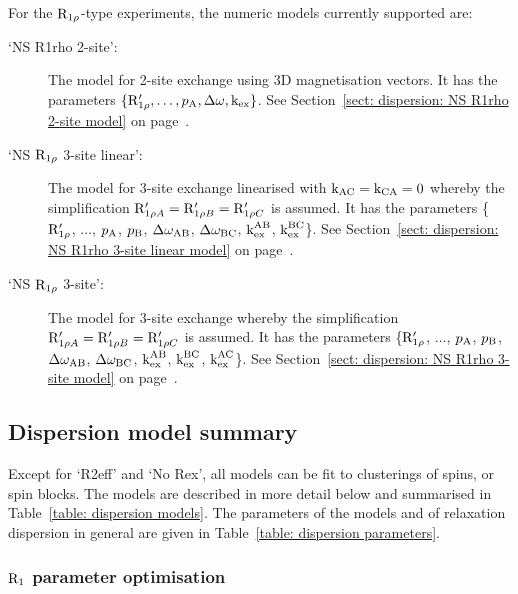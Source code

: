 For the $\mathrm{R}_{1\rho}$-type experiments, the numeric models currently supported are:
\begin{description}
  \item[`NS R1rho 2-site':]  The model for 2-site exchange using 3D magnetisation vectors.
    It has the parameters $\{\mathrm{R}_{1\rho}', \dots, p_{\textrm{A}}, \Delta\omega, \textrm{k}_{\textrm{ex}}\}$.
    See Section~\ref{sect: dispersion: NS R1rho 2-site model} on page~\pageref{sect: dispersion: NS R1rho 2-site model}.
  \item[`NS $\mathrm{R}_{1\rho}$ 3-site linear':]  The model for 3-site exchange linearised with $\textrm{k}_{\textrm{AC}}=\textrm{k}_{\textrm{CA}}=0$ whereby the simplification $\mathrm{R}_{1\rho A}' = \mathrm{R}_{1\rho B}' = \mathrm{R}_{1\rho C}'$ is assumed.
    It has the parameters \{$\mathrm{R}_{1\rho}'$, $\dots$, $p_{\textrm{A}}$, $p_{\textrm{B}}$, $\Delta\omega_{\textrm{AB}}$, $\Delta\omega_{\textrm{BC}}$, $\textrm{k}_{\textrm{ex}}^{\textrm{AB}}$, $\textrm{k}_{\textrm{ex}}^{\textrm{BC}}$\}.
    See Section~\ref{sect: dispersion: NS R1rho 3-site linear model} on page~\pageref{sect: dispersion: NS R1rho 3-site linear model}.
  \item[`NS $\mathrm{R}_{1\rho}$ 3-site':]  The model for 3-site exchange whereby the simplification $\mathrm{R}_{1\rho A}' = \mathrm{R}_{1\rho B}' = \mathrm{R}_{1\rho C}'$ is assumed.
    It has the parameters \{$\mathrm{R}_{1\rho}'$, $\dots$, $p_{\textrm{A}}$, $p_{\textrm{B}}$, $\Delta\omega_{\textrm{AB}}$, $\Delta\omega_{\textrm{BC}}$, $\textrm{k}_{\textrm{ex}}^{\textrm{AB}}$, $\textrm{k}_{\textrm{ex}}^{\textrm{BC}}$, $\textrm{k}_{\textrm{ex}}^{\textrm{AC}}$\}.
    See Section~\ref{sect: dispersion: NS R1rho 3-site model} on page~\pageref{sect: dispersion: NS R1rho 3-site model}.
\end{description}




\subsection{Dispersion model summary}

Except for `R2eff' and `No Rex', all models can be fit to clusterings of spins, or spin blocks.
The models are described in more detail below and summarised in Table~\ref{table: dispersion models}.
The parameters of the models and of relaxation dispersion in general are given in Table~\ref{table: dispersion parameters}.


\subsubsection{$\mathrm{R}_1$ parameter optimisation}

